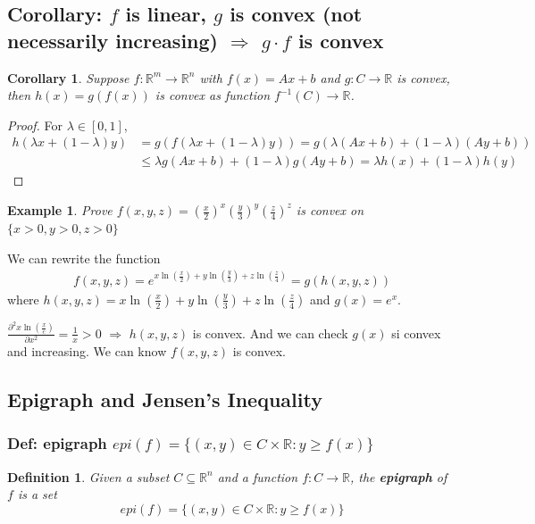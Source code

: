 \documentclass[11pt,a4paper]{article}
\newtheorem{example}{Example}
\newtheorem{corollary}{Corollary}
\newtheorem{definition}{Definition}
\begin{document}
\subsection{Corollary: $f$ is linear, $g$ is convex (not necessarily increasing) $\Rightarrow$ $g\cdot f$ is convex}
\begin{corollary}
    Suppose $f:\mathbb{R}^m \rightarrow \mathbb{R}^n$ with $f(x)=Ax+b$ and $g:C \rightarrow \mathbb{R}$ is convex, then $h(x)=g(f(x))$ is convex as function $f^{-1}(C) \rightarrow \mathbb{R}$.
\end{corollary}
\begin{proof}
For $\lambda\in[0,1]$,
\begin{equation}
    \begin{aligned}
        h(\lambda x+(1-\lambda)y)&=g(f(\lambda x+(1-\lambda)y))= g(\lambda(Ax+b)+(1-\lambda)(Ay+b))\\
        &\leq \lambda g(Ax+b)+(1-\lambda)g(Ay+b)=\lambda h(x)+(1-\lambda)h(y)
    \end{aligned}
    \nonumber
\end{equation}
\end{proof}


\begin{example}
    Prove $f(x,y,z)=(\frac{x}{2})^x(\frac{y}{3})^y(\frac{z}{4})^z$ is convex on $\{x>0,y>0,z>0\}$
\end{example}
We can rewrite the function
\begin{equation}
    \begin{aligned}
        f(x,y,z)=e^{x\ln(\frac{x}{2})+y\ln(\frac{y}{3})+z\ln(\frac{z}{4})}=g(h(x,y,z))
    \end{aligned}
    \nonumber
\end{equation}
where $h(x,y,z)=x\ln(\frac{x}{2})+y\ln(\frac{y}{3})+z\ln(\frac{z}{4})$ and $g(x)=e^x$.

$\frac{\partial^2 x\ln(\frac{x}{c})}{\partial x^2}=\frac{1}{x}>0$ $\Rightarrow$ $h(x,y,z)$ is convex. And we can check $g(x)$ si convex and increasing. We can know $f(x,y,z)$ is convex.

\subsection{Epigraph and Jensen's Inequality}
\subsubsection{Def: epigraph ${epi}(f)=\{(x,y)\in C\times \mathbb{R}:y\geq f(x)\}$}
\begin{definition}
    Given a subset $C \subseteq \mathbb{R}^n$ and a function $f: C \rightarrow \mathbb{R}$, the \textbf{epigraph} of $f$ is a set $${epi}(f)=\{(x,y)\in C\times \mathbb{R}:y\geq f(x)\}$$
\end{definition}
\end{document}
